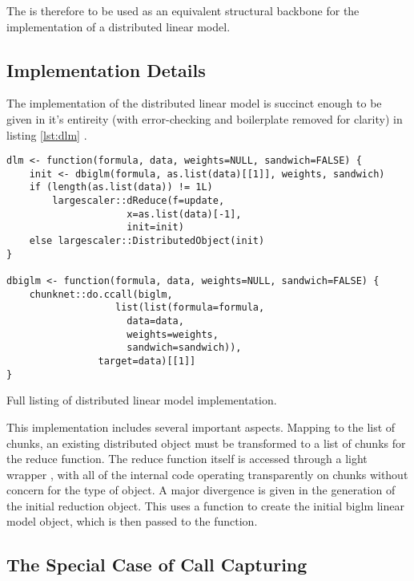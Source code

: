 The  is therefore to be used as an equivalent structural backbone for the implementation of a distributed linear model.

\subsection{Implementation Details}

The implementation of the distributed linear model is succinct enough to be given in it's entireity (with error-checking and boilerplate removed for clarity) in listing \cref{lst:dlm} .

\begin{listing}
	\begin{verbatim}
dlm <- function(formula, data, weights=NULL, sandwich=FALSE) {
	init <- dbiglm(formula, as.list(data)[[1]], weights, sandwich)
	if (length(as.list(data)) != 1L)
		largescaler::dReduce(f=update,
				     x=as.list(data)[-1],
				     init=init)
	else largescaler::DistributedObject(init)
}

dbiglm <- function(formula, data, weights=NULL, sandwich=FALSE) {
	chunknet::do.ccall(biglm,
		           list(list(formula=formula,
				     data=data,
				     weights=weights,
				     sandwich=sandwich)),
			    target=data)[[1]]
}
\end{verbatim}
\caption{Full listing of distributed linear model implementation.}
\label{lst:dlm}
\end{listing}

This implementation includes several important aspects.
Mapping to the list of chunks, an existing distributed object must be transformed to a list of chunks for the reduce function.
The reduce function itself is accessed through a light wrapper , with all of the internal code operating transparently on chunks without concern for the type of object.
A major divergence is given in the generation of the initial reduction object.
This uses a  function to create the initial biglm linear model object, which is then passed to the  function.

\subsection{The Special Case of Call Capturing}


